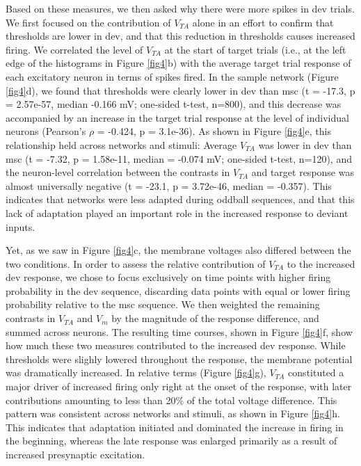 \documentclass[pdflatex,referee,iicol,sn-basic]{sn-jnl}
\theoremstyle{thmstyleone}%
\theoremstyle{thmstyletwo}%
\theoremstyle{thmstylethree}%
\begin{document}
Based on these measures, we then asked why there were more spikes in dev trials. We first focused on the contribution of $V_{TA}$ alone in an effort to confirm that thresholds are lower in dev, and that this reduction in thresholds causes increased firing. We correlated the level of $V_{TA}$ at the start of target trials (i.e., at the left edge of the histograms in Figure \ref{fig4}b) with the average target trial response of each excitatory neuron in terms of spikes fired. In the sample network (Figure \ref{fig4}d), we found that thresholds were clearly lower in dev than msc (t = -17.3, p = 2.57e-57, median -0.166 mV; one-sided t-test, n=800), and this decrease was accompanied by an increase in the target trial response at the level of individual neurons (Pearson's $\rho$ = -0.424, p = 3.1e-36). As shown in Figure \ref{fig4}e, this relationship held across networks and stimuli: Average $V_{TA}$ was lower in dev than msc (t = -7.32, p = 1.58e-11, median = -0.074 mV; one-sided t-test, n=120), and the neuron-level correlation between the contrasts in $V_{TA}$ and target response was almost universally negative (t = -23.1, p = 3.72e-46, median = -0.357). This indicates that networks were less adapted during oddball sequences, and that this lack of adaptation played an important role in the increased response to deviant inputs.

Yet, as we saw in Figure \ref{fig4}c, the membrane voltages also differed between the two conditions. In order to assess the relative contribution of $V_{TA}$ to the increased dev response, we chose to focus exclusively on time points with higher firing probability in the dev sequence, discarding data points with equal or lower firing probability relative to the msc sequence. We then weighted the remaining contrasts in $V_{TA}$ and $V_m$ by the magnitude of the response difference, and summed across neurons. The resulting time courses, shown in Figure \ref{fig4}f, show how much these two measures contributed to the increased dev response. While thresholds were slighly lowered throughout the response, the membrane potential was dramatically increased. In relative terms (Figure \ref{fig4}g), $V_{TA}$ constituted a major driver of increased firing only right at the onset of the response, with later contributions amounting to less than 20\% of the total voltage difference. This pattern was consistent across networks and stimuli, as shown in Figure \ref{fig4}h. This indicates that adaptation initiated and dominated the increase in firing in the beginning, whereas the late response was enlarged primarily as a result of increased presynaptic excitation.
\end{document}
